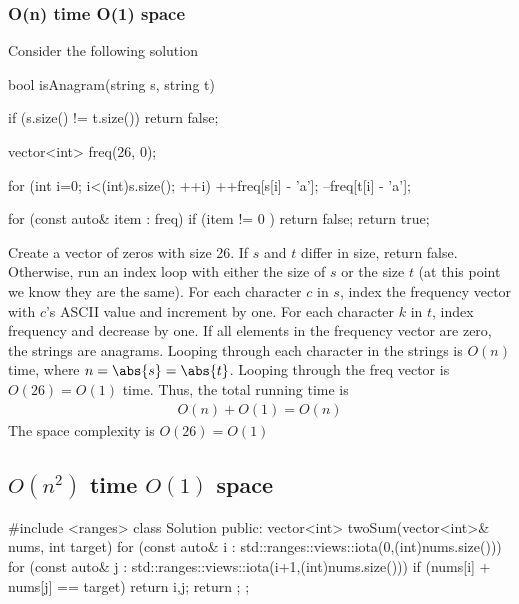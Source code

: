 \documentclass{report}
\begin{document}
    \subsubsection{O(n) time O(1) space}
    \bigbreak \noindent 
    Consider the following solution
    \bigbreak \noindent 
    \begin{cppcode}
        bool isAnagram(string s, string t) {
            if (s.size() != t.size()) return false;

            vector<int> freq(26, 0);

            for (int i=0; i<(int)s.size(); ++i) {
                ++freq[s[i] - 'a'];
                --freq[t[i] - 'a'];
            }

            for (const auto& item : freq) {
                if (item != 0 ) return false;
            }
            return true;
        }
    \end{cppcode}
    \bigbreak \noindent 
    Create a vector of zeros with size 26. If $s$ and $t$ differ in size, return false. Otherwise, run an index loop with either the size of $s$ or the size $t$ (at this point we know they are the same). For each character $c$ in $s$, index the frequency vector with $c$'s ASCII value and increment by one. For each character $k$ in $t$, index frequency and decrease by one. If all elements in the frequency vector are zero, the strings are anagrams.
    \bigbreak \noindent 
    Looping through each character in the strings is $O(n)$ time, where $n=\abs{s}=\abs{t}$. Looping through the freq vector is $O(26) = O(1)$ time. Thus, the total running time is 
    \begin{align*}
        O(n) + O(1) = O(n)
    \end{align*}
    \bigbreak \noindent 
    The space complexity is $O(26) = O(1) $

    \pagebreak 
    \bigbreak \noindent 
    \subsection{$O(n^{2})$ time $O(1)$ space}
    \bigbreak \noindent 
    \begin{cppcode}
        #include <ranges>
        class Solution {
            public:
            vector<int> twoSum(vector<int>& nums, int target) {
                for (const auto& i : std::ranges::views::iota(0,(int)nums.size())) {
                    for (const auto& j : std::ranges::views::iota(i+1,(int)nums.size())) {
                        if (nums[i] + nums[j] == target) return {i,j};
                    }
                }
                return {};
            }
        };
    \end{cppcode}
    \bigbreak \noindent 
\end{document}
